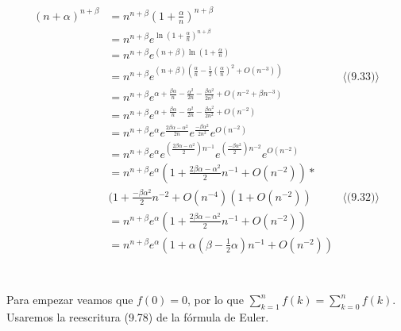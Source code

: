 \documentclass{article}
\begin{document}
\section{}

\begin{align*}
(n+\alpha)^{n+\beta} & = n^{n+\beta}(1+\frac{\alpha}{n})^{n+\beta} \\
                     & = n^{n+\beta} e^{\ln (1+\frac{\alpha}{n})^{n+\beta}}\\
                     & = n^{n+\beta} e^{(n+\beta)\ln (1+\frac{\alpha}{n})}\\
                     & = n^{n+\beta} e^{(n+\beta) (\frac{\alpha}{n}-\frac{1}{2}(\frac{\alpha}{n})^2+O(n^{-3}))}
                         & \langle \text{(9.33)} \rangle \\
                     & = n^{n+\beta} e^{\alpha+\frac{\beta\alpha}{n}-\frac{\alpha^2}{2n}-\frac{\beta\alpha^2}{2n^2}+O(n^{-2}+\beta n^{-3})} \\
                     & = n^{n+\beta} e^{\alpha+\frac{\beta\alpha}{n}-\frac{\alpha^2}{2n}-\frac{\beta\alpha^2}{2n^2}+O(n^{-2})} \\
                     & = n^{n+\beta} e^{\alpha}e^{\frac{2\beta\alpha-\alpha^2}{2n}}e^{\frac{-\beta\alpha^2}{2n^2}}e^{O(n^{-2})} \\
                     & = n^{n+\beta} e^{\alpha}e^{(\frac{2\beta\alpha-\alpha^2}{2})n^{-1}}e^{(\frac{-\beta\alpha^2}{2})n^{-2}}e^{O(n^{-2})} \\
                     & = n^{n+\beta}
                         e^{\alpha}
                         (1 + \frac{2\beta\alpha-\alpha^2}{2}n^{-1}+O(n^{-2}))* \\
                         & (1+\frac{-\beta\alpha^2}{2}n^{-2}+O(n^{-4}) 
                         (1+O(n^{-2})) & \langle \text{(9.32)} \rangle \\
                     & = n^{n+\beta} e^{\alpha} (1 + \frac{2\beta\alpha-\alpha^2}{2}n^{-1}+O(n^{-2})) \\
                     & = n^{n+\beta} e^{\alpha} (1 + \alpha (\beta - \frac{1}{2}\alpha) n^{-1}+O(n^{-2})) \\
\end{align*}

\section{}

Para empezar veamos que $f(0) = 0$, por lo que $\sum_{k=1}^n f(k) = \sum_{k=0}^n f(k)$.
Usaremos la reescritura (9.78) de la fórmula de Euler.
\end{document}
